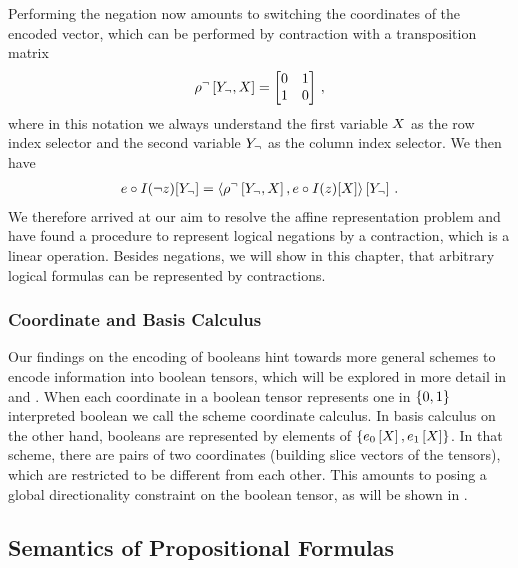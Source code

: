 Performing the negation now amounts to switching the coordinates of the encoded vector, which can be performed by contraction with a transposition matrix
\begin{align*}
	\rho^{\lnot}\left[Y_{\lnot},X\right] = 
	\begin{bmatrix}
		0 & 1 \\
		1 & 0
	\end{bmatrix} \, ,
\end{align*}
where in this notation we always understand the first variable $X$ as the row index selector and the second variable $Y_{\lnot}$ as the column index selector.
We then have
\begin{align*}
	e\circ I(\lnot z)[Y_{\lnot}] 
	= \left\langle \rho^{\lnot}\left[Y_{\lnot},X\right],e\circ I(z)[X]\right\rangle \left[ Y_{\lnot} \right] \, .  
\end{align*}
We therefore arrived at our aim to resolve the affine representation problem and have found a procedure to represent logical negations by a contraction, which is a linear operation.
Besides negations, we will show in this chapter, that arbitrary logical formulas can be represented by contractions.

\subsubsection{Coordinate and Basis Calculus}

Our findings on the encoding of booleans hint towards more general schemes to encode information into boolean tensors, which will be explored in more detail in  and .
When each coordinate in a boolean tensor represents one in $\{0,1\}$ interpreted boolean we call the scheme coordinate calculus.
In basis calculus on the other hand, booleans are represented by elements of $\{e_0\left[X\right],e_1\left[X\right]\}$.
In that scheme, there are pairs of two coordinates (building slice vectors of the tensors), which are restricted to be different from each other.
This amounts to posing a global directionality constraint on the boolean tensor, as will be shown in .

\subsection{Semantics of Propositional Formulas}

